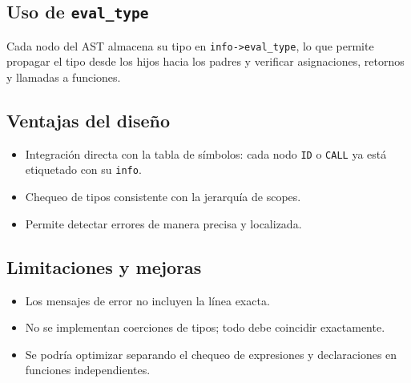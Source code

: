 \documentclass[12pt,a4paper]{article}
\begin{document}
\subsection{Uso de \texttt{eval\_type}}
Cada nodo del AST almacena su tipo en \texttt{info->eval\_type}, lo que permite propagar el tipo desde los hijos hacia los padres y verificar asignaciones, retornos y llamadas a funciones.

\subsection{Ventajas del diseño}
\begin{itemize}
    \item Integración directa con la tabla de símbolos: cada nodo \texttt{ID} o \texttt{CALL} ya está etiquetado con su \texttt{info}.
    \item Chequeo de tipos consistente con la jerarquía de scopes.
    \item Permite detectar errores de manera precisa y localizada.
\end{itemize}

\subsection{Limitaciones y mejoras}
\begin{itemize}
    \item Los mensajes de error no incluyen la línea exacta.
    \item No se implementan coerciones de tipos; todo debe coincidir exactamente.
    \item Se podría optimizar separando el chequeo de expresiones y declaraciones en funciones independientes.
\end{itemize}
\end{document}
